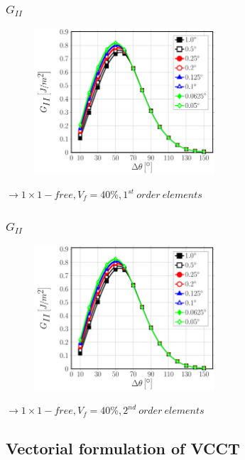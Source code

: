 \documentclass[first,firstsupp,lastsupp,last,hyperref,table]{ETHclass}
\begin{document}
\begin{frame}
\frametitle{\vspace{0.25cm}\small $G_{II}$}
\vspace{-.75cm}
\centering
\begin{figure}
\centering
\includegraphics[width=0.6\textwidth]{Vf40-free-1st-GII.pdf}
\end{figure}
$\rightarrow 1\times1-free, V_{f}=40\%, 1^{st}\ order\ elements$ 
\end{frame}

\addtocounter{framenumber}{-1}

\begin{frame}
\frametitle{\vspace{0.25cm}\small $G_{II}$}
\vspace{-.75cm}
\centering
\begin{figure}
\centering
\includegraphics[width=0.6\textwidth]{Vf40-free-2nd-GII.pdf}
\end{figure}
$\rightarrow 1\times1-free, V_{f}=40\%, 2^{nd}\ order\ elements$ 
\end{frame}

\subsection{Vectorial formulation of VCCT}
\end{document}
